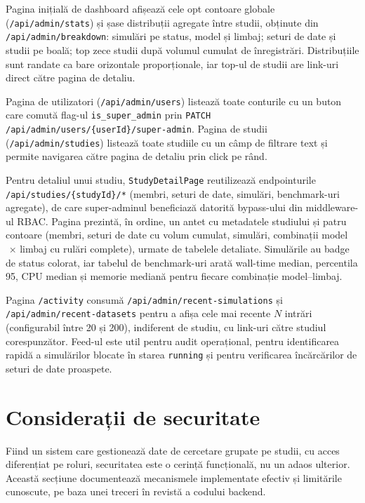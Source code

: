 Pagina inițială de dashboard afișează cele opt contoare globale
(\texttt{/api/admin/stats}) și șase distribuții agregate între studii,
obținute din \texttt{/api/admin/breakdown}: simulări pe status, model și
limbaj; seturi de date și studii pe boală; top zece studii după volumul
cumulat de înregistrări. Distribuțiile sunt randate ca bare orizontale
proporționale, iar top-ul de studii are link-uri direct către pagina de
detaliu.

Pagina de utilizatori (\texttt{/api/admin/users}) listează toate conturile
cu un buton care comută flag-ul \texttt{is\_super\_admin} prin
\texttt{PATCH /api/admin/users/\{userId\}/super-admin}. Pagina de studii
(\texttt{/api/admin/studies}) listează toate studiile cu un câmp de
filtrare text și permite navigarea către pagina de detaliu prin click pe
rând.

Pentru detaliul unui studiu, \texttt{StudyDetailPage} reutilizează
endpointurile \texttt{/api/studies/\{studyId\}/*} (membri, seturi de date,
simulări, benchmark-uri agregate), de care super-adminul beneficiază
datorită bypass-ului din middleware-ul RBAC. Pagina prezintă, în ordine,
un antet cu metadatele studiului și patru contoare (membri, seturi de date
cu volum cumulat, simulări, combinații model$\,\times\,$limbaj cu rulări
complete), urmate de tabelele detaliate. Simulările au badge de status
colorat, iar tabelul de benchmark-uri arată wall-time median, percentila
95, CPU median și memorie mediană pentru fiecare combinație
model--limbaj.

Pagina \texttt{/activity} consumă \texttt{/api/admin/\allowbreak recent-simulations}
și \texttt{/api/admin/\allowbreak recent-datasets} pentru a afișa cele mai recente $N$
intrări (configurabil între 20 și 200), indiferent de studiu, cu link-uri
către studiul corespunzător. Feed-ul este util pentru audit operațional,
pentru identificarea rapidă a simulărilor blocate în starea
\texttt{running} și pentru verificarea încărcărilor de seturi de date
proaspete.

\section{Considerații de securitate}
\label{sec:securitate}

Fiind un sistem care gestionează date de cercetare grupate pe studii, cu acces
diferențiat pe roluri, securitatea este o cerință funcțională, nu un adaos
ulterior. Această secțiune documentează mecanismele implementate efectiv și
limitările cunoscute, pe baza unei treceri în revistă a codului backend.

